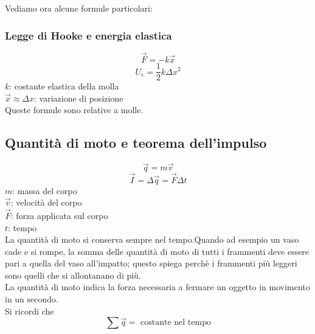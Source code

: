 Vediamo ora alcune formule particolari:
\subsubsection{Legge di Hooke e energia elastica}
\begin{equation*}
\vec{F} = -k\vec{x}
\end{equation*}
\begin{equation*}
U_e = \frac{1}{2}k\Delta x^2
\end{equation*}
$k$: costante elastica della molla\\
$\vec{x} \approx \Delta x$: variazione di posizione\\[\baselineskip]
Queste formule sono relative a molle.\\

\subsection{Quantità di moto e teorema dell'impulso}\label{subsec:dinamica:impulso}
\label{subsec:qtaMoto}
\begin{equation*}
\vec{q} = m\vec{v}
\end{equation*}
\begin{equation*}
\vec{I} = \Delta \vec{q} = \vec{F}\Delta t
\end{equation*}
$m$: massa del corpo\\
$\vec{v}$: velocità del corpo\\
$\vec{F}$: forza applicata sul corpo\\
$t$: tempo\\[\baselineskip]
La quantità di moto si conserva sempre nel tempo.Quando ad esempio un vaso cade e si rompe, la 
somma delle quantità di moto di tutti i frammenti deve essere pari a quella del vaso all'impatto; 
questo spiega perchè i frammenti più leggeri sono quelli che si allontanano di più.\\
La quantità di moto indica la forza necessaria a fermare un oggetto in movimento in un secondo.\\
[\baselineskip]
Si ricordi che
\begin{equation*}
\sum \vec{q} = \text{ costante nel tempo}
\end{equation*}
\begin{center}
\end{center}
